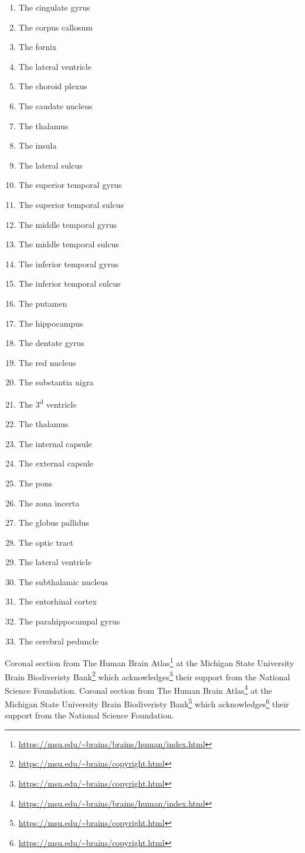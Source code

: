 \documentclass[]{book}
\providecommand{\tightlist}{%
  \setlength{\itemsep}{0pt}\setlength{\parskip}{0pt}}
\let\rmarkdownfootnote\footnote%
\def\footnote{\protect\rmarkdownfootnote}
\renewcommand{\href}[2]{#2\footnote{\url{#1}}}
\begin{document}
\begin{enumerate}
\def\labelenumi{\arabic{enumi}.}
\tightlist
\item
  The cingulate gyrus
\item
  The corpus callosum
\item
  The fornix
\item
  The lateral ventricle
\item
  The choroid plexus
\item
  The caudate nucleus
\item
  The thalamus
\item
  The insula
\item
  The lateral sulcus
\item
  The superior temporal gyrus
\item
  The superior temporal sulcus
\item
  The middle temporal gyrus
\item
  The middle temporal sulcus
\item
  The inferior temporal gyrus
\item
  The inferior temporal sulcus
\item
  The putamen
\item
  The hippocampus
\item
  The dentate gyrus
\item
  The red nucleus
\item
  The substantia nigra
\item
  The 3\textsuperscript{d} ventricle
\item
  The thalamus
\item
  The internal capsule
\item
  The external capsule
\item
  The pons
\item
  The zona incerta
\item
  The globus pallidus
\item
  The optic tract
\item
  The lateral ventricle
\item
  The subthalamic nucleus
\item
  The entorhinal cortex
\item
  The parahippocampal gyrus
\item
  The cerebral peduncle
\end{enumerate}

Coronal section from \href{https://msu.edu/~brains/brains/human/index.html}{The Human Brain Atlas} at the \href{https://msu.edu/~brains/copyright.html}{Michigan State University Brain Biodiveristy Bank} which \href{https://msu.edu/~brains/copyright.html}{acknowledges} their support from the National Science Foundation. Coronal section from \href{https://msu.edu/~brains/brains/human/index.html}{The Human Brain Atlas} at the \href{https://msu.edu/~brains/copyright.html}{Michigan State University Brain Biodiveristy Bank} which \href{https://msu.edu/~brains/copyright.html}{acknowledges} their support from the National Science Foundation.
\end{document}
